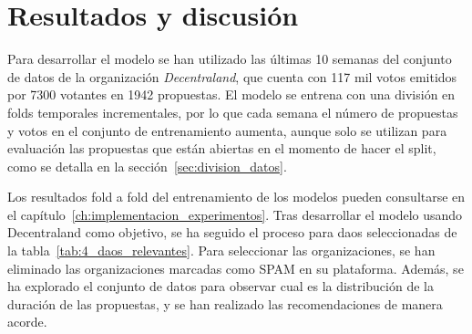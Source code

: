 \chapter{Resultados y discusión}
\label{ch:resultados_discusion}


Para desarrollar el modelo se han utilizado las últimas 10 semanas del conjunto de datos de la organización \textit{Decentraland}, que cuenta con 117 mil votos emitidos por 7300 votantes en 1942 propuestas. El modelo se entrena con una división en folds temporales incrementales, por lo que cada semana el número de propuestas y votos en el conjunto de entrenamiento aumenta, aunque solo se utilizan para evaluación las propuestas que están abiertas en el momento de hacer el split, como se detalla en la sección~\ref{sec:division_datos}.

Los resultados fold a fold del entrenamiento de los modelos pueden consultarse en el capítulo~\ref{ch:implementacion_experimentos}. Tras desarrollar el modelo usando Decentraland como objetivo, se ha seguido el proceso para \glspl{dao} seleccionadas de la tabla~\ref{tab:4_daos_relevantes}. Para seleccionar las organizaciones, se han eliminado las organizaciones marcadas como SPAM en su plataforma. Además, se ha explorado el conjunto de datos para observar cual es la distribución de la duración de las propuestas, y se han realizado las recomendaciones de manera acorde.

